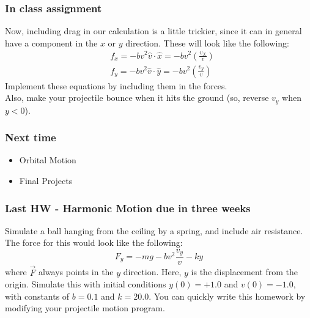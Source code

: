 \documentclass{beamer}
\begin{document}
\begin{frame}
  \frametitle{In class assignment}
  Now, including drag in our calculation is a little trickier, since it
  can in general have a component in the $x$ or $y$ direction. These will
  look like the following:
  \begin{eqnarray*}
    &f_x = -bv^2\hat{v}\cdot\hat{x} = -bv^2\left(\frac{v_X}{v}\right)\\
    &f_y = -bv^2\hat{v}\cdot\hat{y} = -bv^2\left(\frac{v_y}{v}\right)
  \end{eqnarray*}
  Implement these equations by including them in the forces.\\
  Also, make your projectile bounce when it hits the ground (so, reverse $v_y$
  when $y<0$).
\end{frame}

\begin{frame}
  \frametitle{Next time}
  \begin{itemize}
  \item Orbital Motion
  \item Final Projects
  \end{itemize}
\end{frame}

\begin{frame}
  \frametitle{Last HW - Harmonic Motion due in three weeks}
  Simulate a ball hanging from the ceiling by a spring, 
  and include air resistance.
  The force for this would look like the following:
  \begin{equation*}
    F_y = -mg - bv^2\frac{v_y}{v} - ky
  \end{equation*}
  where $\vec{F}$ always points in the $y$ direction. Here,
  $y$ is the displacement from the origin.
  Simulate this with initial conditions $y(0)=+1.0$ and $v(0)=-1.0$, 
  with constants of $b=0.1$ and $k = 20.0$.
  You can quickly write this homework by modifying your projectile motion
  program.
\end{frame}
\end{document}
